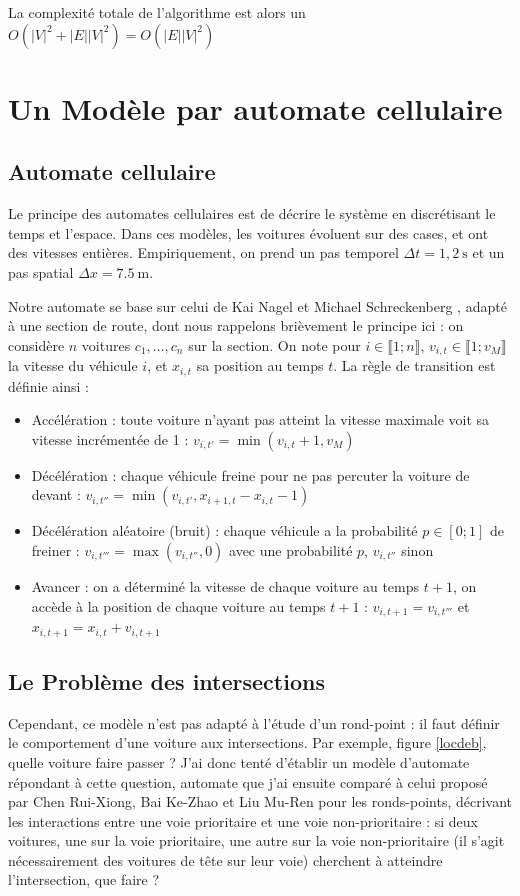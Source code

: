 \documentclass[11pt]{article}
\begin{document}
La complexité totale de l'algorithme est alors un $O(|V|^2 + |E||V|^2) = O(|E||V|^2)$

\section{Un Modèle par automate cellulaire}
	\subsection{Automate cellulaire}
	Le principe des automates cellulaires est de décrire le système en discrétisant le temps et l'espace. Dans ces modèles, les voitures évoluent sur des cases, et ont des vitesses entières. Empiriquement, on prend un pas temporel $\Delta t = 1,2~\mathrm{s}$ et un pas spatial $\Delta x = 7.5~\mathrm{m}$. \par
	Notre automate se base sur celui de Kai Nagel et Michael Schreckenberg \cite{NaSch}, adapté à une section de route, 
dont nous rappelons brièvement le principe ici : on considère $n$ voitures $c_1, … , c_n$ sur la section. On note pour $i \in \llbracket 1;n \rrbracket$, $v_{i,t} \in \llbracket 1;v_M \rrbracket$ la vitesse du véhicule $i$, et $x_{i,t}$ sa position au temps $t$. La règle de transition est définie ainsi :
	\begin{itemize}
		\item Accélération : toute voiture n'ayant pas atteint la vitesse maximale voit sa vitesse incrémentée de 1 : $v_{i,t'} = \min(v_{i,t} + 1, v_M)$
		\item Décélération : chaque véhicule freine pour ne pas percuter la voiture de devant : $v_{i,t''} = \min(v_{i,t'},x_{i+1,t}-x_{i,t}-1)$
		\item Décélération aléatoire (bruit) : chaque véhicule a la probabilité $p \in [ 0;1 ]$ de freiner : $v_{i,t'''} = \max(v_{i,t''},0)$ avec une probabilité $p$, $v_{i,t''}$ sinon
		\item Avancer : on a déterminé la vitesse de chaque voiture au temps $t+1$, on accède à la position de chaque voiture au temps $t+1$ : $v_{i,t+1} = v_{i,t'''}$ et $x_{i,t+1} = x_{i,t} + v_{i,t+1}$
	\end{itemize}
	
	\subsection{Le Problème des intersections}
	Cependant, ce modèle n'est pas adapté à l'étude d'un rond-point : il faut définir le comportement d'une voiture aux intersections. Par exemple, figure \ref{locdeb}, quelle voiture faire passer ? J'ai donc tenté d'établir un modèle d'automate répondant à cette question, automate que j'ai ensuite comparé à celui proposé par Chen Rui-Xiong, Bai Ke-Zhao et Liu Mu-Ren\cite{ChPh} pour les ronds-points, décrivant les interactions entre une voie prioritaire et une voie non-prioritaire : si deux voitures, une sur la voie prioritaire, une autre sur la voie non-prioritaire (il s'agit nécessairement des voitures de tête sur leur voie) cherchent à atteindre l'intersection, que faire ?
\end{document}
